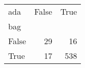 \begin{tabular}{lrr}
\toprule
ada &  False &  True  \\
bag   &        &        \\
\midrule
False &     29 &     16 \\
True  &     17 &    538 \\
\bottomrule
\end{tabular}
